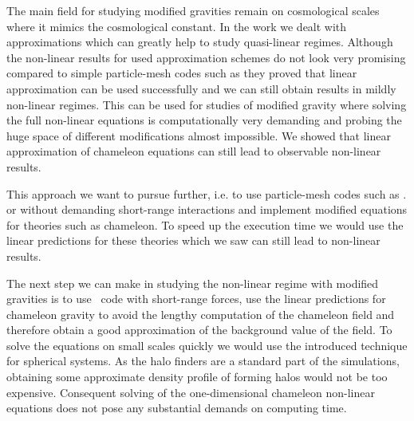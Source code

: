 The main field for studying modified gravities remain on cosmological scales where it mimics the cosmological constant. In the work we dealt with approximations which can greatly help to study quasi-linear regimes. Although the non-linear results for used approximation schemes do not look very promising compared to simple particle-mesh codes such as  they proved that linear approximation can be used successfully and we can still obtain results in mildly non-linear regimes. This can be used for studies of modified gravity where solving the full non-linear equations is computationally very demanding and probing the huge space of different modifications almost impossible. We showed that linear approximation of chameleon equations can still lead to observable non-linear results.

This approach we want to pursue further, i.e. to use particle-mesh codes such as .  or  without demanding short-range interactions and implement modified equations for theories such as chameleon. To speed up the execution time we would use the linear predictions for these theories which we saw can still lead to non-linear results.

The next step we can make in studying the non-linear regime with modified gravities is to use \nbody\ code with short-range forces, use the linear predictions for chameleon gravity to avoid the lengthy computation of the chameleon field and therefore obtain a good approximation of the background value of the field. To solve the equations on small scales quickly we would use the introduced technique for spherical systems. As the halo finders are a standard part of the simulations, obtaining some approximate density profile of forming halos would not be too expensive. Consequent solving of the one-dimensional chameleon non-linear equations does not pose any substantial demands on computing time.